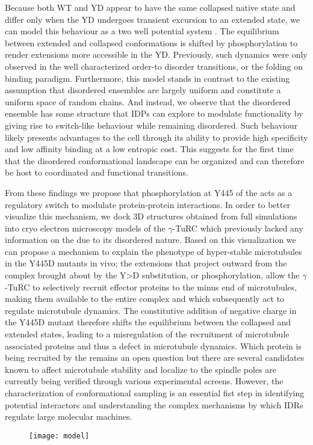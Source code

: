  Because both WT and YD appear to have the same collapsed native state and differ only when the YD undergoes transient excursion to an extended state, we can model this behaviour as a two well potential system . The equilibrium between extended and collapsed conformations is shifted by phosphorylation to render extensions more accessible in the YD.  Previously, such dynamics were only observed in the well characterized order-to disorder transitions, or the folding on binding paradigm. Furthermore, this model stands in contrast to the existing assumption that disordered ensembles are largely uniform  and constitute a uniform space of random chains. And instead, we observe that the disordered ensemble has some structure that IDPs can explore to modulate functionality by giving rise to switch-like behaviour while remaining disordered. Such behaviour likely presents advantages to the cell through its ability to provide high specificity and low affinity binding at a low entropic cost. This suggests for the first time that the disordered conformational landscape can be organized and can therefore be host to coordinated and functional transitions.

\begin{figure}
\centering     %
{}
\label{fig:wells}
\end{figure}

From these findings we propose that phosphorylation at Y445 of the \gct acts as a regulatory switch to modulate protein-protein interactions. In order to better visualize this mechanism, we dock 3D structures obtained from full \tub simulations into cryo electron microscopy models of the $\gamma$-TuRC  which previously lacked any information on the \gct due to its disordered nature. Based on this visualization we can propose a mechanism to explain the phenotype of hyper-stable microtubules in the Y445D mutants in vivo; the extensions that project outward from the complex brought about by the Y>D substitution, or phosphorylation, allow the $\gamma$-TuRC to selectively recruit effector proteins to the minus end of microtubules, making them available to the entire complex and which subsequently act to regulate microtubule dynamics. The constitutive addition of negative charge in the Y445D mutant therefore shifts the equilibrium between the collapsed and extended states, leading to a misregulation of the recruitment of microtubule associated proteins and thus a defect in microtubule dynamics. Which protein is being recruited by the \gct remains an open question but there are several candidates known to affect microtubule stability and localize to the spindle poles  are currently being verified through various experimental screens. However, the characterization of \gct conformational sampling  is an essential fist step in identifying potential interactors and understanding the complex mechanisms by which IDRs regulate large molecular machines.

\begin{figure}
\centering
\texttt{[image: model]}
\label{fig:turc}
\end{figure}